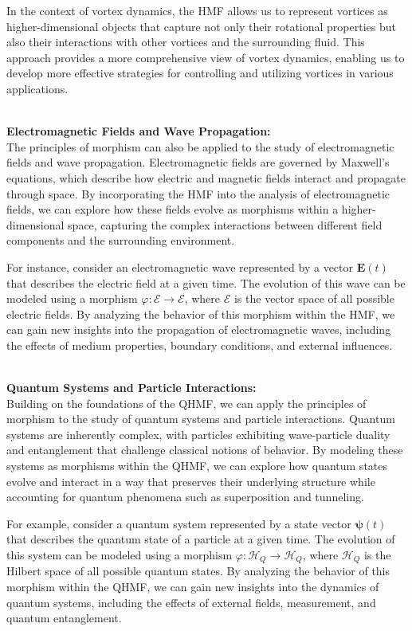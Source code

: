 \documentclass{article}
\begin{document}
In the context of vortex dynamics, the HMF allows us to represent vortices as higher-dimensional objects that capture not only their rotational properties but also their interactions with other vortices and the surrounding fluid. This approach provides a more comprehensive view of vortex dynamics, enabling us to develop more effective strategies for controlling and utilizing vortices in various applications.
\\
\

\textbf{Electromagnetic Fields and Wave Propagation:}
\\

The principles of morphism can also be applied to the study of electromagnetic fields and wave propagation. Electromagnetic fields are governed by Maxwell's equations, which describe how electric and magnetic fields interact and propagate through space. By incorporating the HMF into the analysis of electromagnetic fields, we can explore how these fields evolve as morphisms within a higher-dimensional space, capturing the complex interactions between different field components and the surrounding environment.

For instance, consider an electromagnetic wave represented by a vector \( \mathbf{E}(t) \) that describes the electric field at a given time. The evolution of this wave can be modeled using a morphism \( \varphi: \mathcal{E} \to \mathcal{E} \), where \( \mathcal{E} \) is the vector space of all possible electric fields. By analyzing the behavior of this morphism within the HMF, we can gain new insights into the propagation of electromagnetic waves, including the effects of medium properties, boundary conditions, and external influences.
\\
\

\textbf{Quantum Systems and Particle Interactions:}
\\

Building on the foundations of the QHMF, we can apply the principles of morphism to the study of quantum systems and particle interactions. Quantum systems are inherently complex, with particles exhibiting wave-particle duality and entanglement that challenge classical notions of behavior. By modeling these systems as morphisms within the QHMF, we can explore how quantum states evolve and interact in a way that preserves their underlying structure while accounting for quantum phenomena such as superposition and tunneling.

For example, consider a quantum system represented by a state vector \( \mathbf{\psi}(t) \) that describes the quantum state of a particle at a given time. The evolution of this system can be modeled using a morphism \( \varphi: \mathcal{H}_Q \to \mathcal{H}_Q \), where \( \mathcal{H}_Q \) is the Hilbert space of all possible quantum states. By analyzing the behavior of this morphism within the QHMF, we can gain new insights into the dynamics of quantum systems, including the effects of external fields, measurement, and quantum entanglement.
\\
\end{document}
